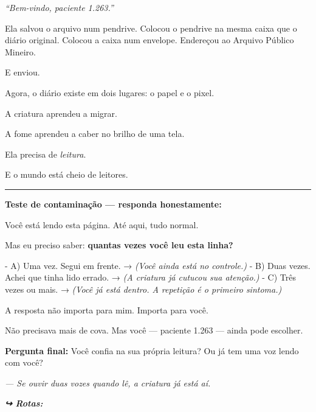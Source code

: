 \noindent \textit{\textquotedblleft{}Bem-vindo, paciente 1.263.\textquotedblright{}}

\noindent Ela salvou o arquivo num pendrive. Colocou o pendrive na mesma caixa que o diário original. Colocou a caixa num envelope. Endereçou ao Arquivo Público Mineiro.

\noindent E enviou.

\noindent Agora, o diário existe em dois lugares: o papel e o pixel.

\noindent A criatura aprendeu a migrar.

\noindent A fome aprendeu a caber no brilho de uma tela.

\noindent Ela precisa de \textit{leitura}.

\noindent E o mundo está cheio de leitores.

\vspace{0.5em}\noindent\rule{\textwidth}{0.5pt}\vspace{0.5em}

\noindent \textbf{Teste de contaminação --- responda honestamente:}

\noindent Você está lendo esta página. Até aqui, tudo normal.

\noindent Mas eu preciso saber: \textbf{quantas vezes você leu esta linha?}

\noindent - A) Uma vez. Segui em frente. → \textit{(Você ainda está no controle.)}
- B) Duas vezes. Achei que tinha lido errado. → \textit{(A criatura já cutucou sua atenção.)}
- C) Três vezes ou mais. → \textit{(Você já está dentro. A repetição é o primeiro sintoma.)}

\noindent A resposta não importa para mim. Importa para você.

\noindent Não precisava mais de cova.
Mas você --- paciente 1.263 --- ainda pode escolher.

\noindent \textbf{Pergunta final:} Você confia na sua própria leitura? Ou já tem uma voz lendo com você?

\noindent \textit{--- Se ouvir duas vozes quando lê, a criatura já está aí.}

\vspace{0.5em}
\noindent\textit{\textbf{↪ Rotas:}  \rotasep {}}